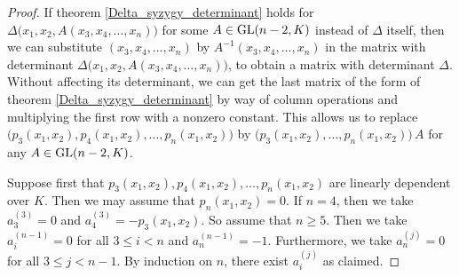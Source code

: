 \documentclass[12pt]{article}
\theoremstyle{definition}
\theoremstyle{remark}
\def\GL{{\rm GL}}
\begin{document}
\begin{proof}
If theorem \ref{Delta_syzygy_determinant} holds for 
$\Delta\big(x_1,x_2,A(x_3,x_4,\ldots,x_n)\big)$ for some $A \in \GL(n-2,K)$
instead of $\Delta$ itself, then we can substitute 
$(x_3,x_4,\ldots,x_n)$ by $A^{-1}(x_3,x_4,\ldots,x_n)$ in the matrix with 
determinant $\Delta\big(x_1,x_2,A(x_3,x_4,\ldots,x_n)\big)$,
to obtain a matrix with determinant $\Delta$. Without affecting its determinant,
we can get the last matrix of the form of theorem \ref{Delta_syzygy_determinant} 
by way of column operations and multiplying the first row with a nonzero constant. 
This allows us to replace $\big(p_3(x_1,x_2),p_4(x_1,x_2),\ldots,p_n(x_1,x_2)\big)$
by $\big(p_3(x_1,x_2),%
\ldots,p_n(x_1,x_2)\big)\,A$ 
for any $A \in \GL(n-2,K)$.

Suppose first that $p_3(x_1,x_2),p_4(x_1,x_2),\ldots,p_n(x_1,x_2)$
are linearly dependent over $K$. Then we may assume that 
$p_n(x_1,x_2) = 0$. If $n = 4$, then we take $a^{(3)}_3 = 0$ and 
$a^{(3)}_4 = -p_3(x_1,x_2)$. So assume that $n \ge 5$. Then we take
$a^{(n-1)}_i = 0$ for all $3 \le i < n$ and $a^{(n-1)}_n = -1$. 
Furthermore, we take $a^{(j)}_n = 0$ for all $3 \le j < n-1$.
By induction on $n$, there exist $a^{(j)}_i$ as claimed.


\end{proof}
\end{document}

